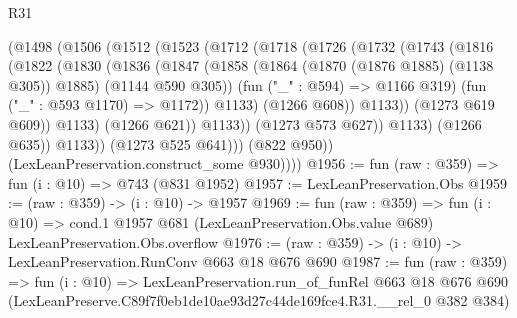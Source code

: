\begin{lexlean}{R31}
\begin{coremodule}
                  (@1498
                    (@1506
                      (@1512
                        (@1523
                          (@1712
                            (@1718
                              (@1726
                                (@1732
                                  (@1743
                                    (@1816
                                      (@1822
                                        (@1830
                                          (@1836
                                            (@1847
                                              (@1858
                                                (@1864 (@1870 (@1876 @1885) (@1138 @305)) @1885)
                                                (@1144 @590 @305))
                                              (fun ("_" : @594) => @1166 @319)
                                              (fun ("_" : @593 @1170) => @1172))
                                            @1133)
                                          (@1266 @608))
                                        @1133))
                                    (@1273 @619 @609))
                                  @1133)
                                (@1266 @621))
                              @1133))
                          (@1273 @573 @627))
                        @1133)
                      (@1266 @635))
                    @1133))
                (@1273 @525 @641)))
            (@822 @950))
          (LexLeanPreservation.construct_some @930))))
@1956 := fun (raw : @359) => fun (i : @10) => @743 (@831 @1952)
@1957 := LexLeanPreservation.Obs
@1959 := (raw : @359) -> (i : @10) -> @1957
@1969 := fun (raw : @359) =>
  fun (i : @10) =>
  cond.{1} @1957 @681 (LexLeanPreservation.Obs.value @689) LexLeanPreservation.Obs.overflow
@1976 := (raw : @359) -> (i : @10) -> LexLeanPreservation.RunConv @663 @18 @676 @690
@1987 := fun (raw : @359) =>
  fun (i : @10) =>
  LexLeanPreservation.run_of_funRel
    @663
    @18
    @676
    @690
    (LexLeanPreserve.C89f7f0eb1de10ae93d27c44de169fce4.R31.__rel_0 @382 @384)
\end{coremodule}
\end{lexlean}
